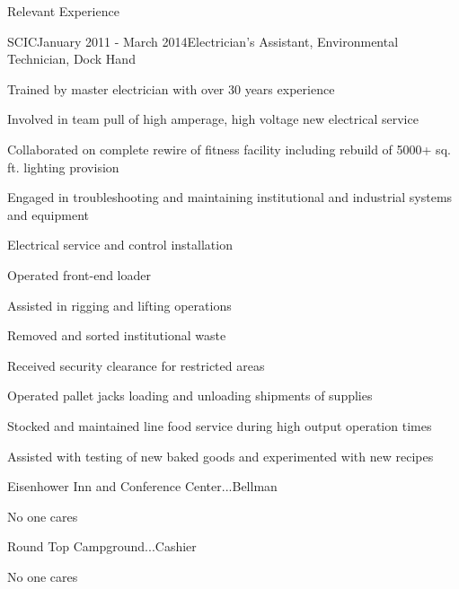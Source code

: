 \documentclass{resume} %
\begin{document}
\begin{rSection}{Relevant Experience}
\begin{rWorkSubsection}{SCIC}{January 2011 - March 2014}{Electrician's Assistant, Environmental Technician, Dock Hand}{}
\item Trained by master electrician with over 30 years experience
\item Involved in team pull of high amperage, high voltage new electrical service
\item Collaborated on complete rewire of fitness facility including rebuild of 5000+ sq. ft. lighting provision
\item Engaged in troubleshooting and maintaining institutional and industrial systems and equipment
\item Electrical service and control installation
\item Operated front-end loader
\item Assisted in rigging and lifting operations
\item Removed and sorted institutional waste
\item Received security clearance for restricted areas
\item Operated pallet jacks loading and unloading shipments of supplies
\item Stocked and maintained line food service during high output operation times
\item Assisted with testing of new baked goods and experimented with new recipes
\end{rWorkSubsection}


\begin{rWorkSubsection}{Eisenhower Inn and Conference Center}{...}{Bellman}{}
\item No one cares
\end{rWorkSubsection}


\begin{rWorkSubsection}{Round Top Campground}{...}{Cashier}{}
\item No one cares
\end{rWorkSubsection}

\end{rSection}


\end{document}
